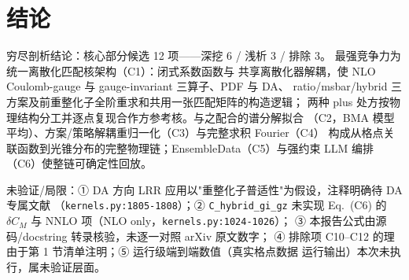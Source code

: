 \documentclass[UTF8]{ctexart}
\begin{document}
\section{结论}
\begin{conclbox}
穷尽剖析结论：核心部分候选 12 项——\textcolor{phys}{深挖 6 / 浅析 3 / 排除 3}。
最强竞争力为 \textcolor{algo}{统一离散化匹配核架构}（C1）：闭式系数函数与
共享离散化器解耦，使 NLO Coulomb-gauge 与 gauge-invariant 三算子、PDF 与 DA、
ratio/msbar/hybrid 三方案及前重整化子全阶重求和共用一张匹配矩阵的构造逻辑；
两种 plus 处方按物理结构分工并逐点复现合作方参考核。与之配合的谱分解拟合
（C2，BMA 模型平均）、方案/策略解耦重归一化（C3）与完整求积 Fourier（C4）
构成从格点关联函数到光锥分布的完整物理链；EnsembleData（C5）与强约束
LLM 编排（C6）使整链可确定性回放。
\end{conclbox}
\begin{warnbox}
未验证/局限：① DA 方向 LRR 应用以"重整化子普适性"为假设，注释明确待 DA 专属文献
（\texttt{\nolinkurl{kernels.py:1805-1808}}）；② \texttt{C\_hybrid\_gi\_gz} 未实现
Eq.~(C6) 的 $\delta C_M$ 与 NNLO 项（NLO only，\texttt{\nolinkurl{kernels.py:1024-1026}}）；
③ 本报告公式由源码/docstring 转录核验，未逐一对照 arXiv 原文数字；
④ 排除项 C10--C12 的理由于第 1 节清单注明；⑤ 运行级端到端数值（真实格点数据
运行输出）本次未执行，属未验证层面。
\end{warnbox}
\end{document}
